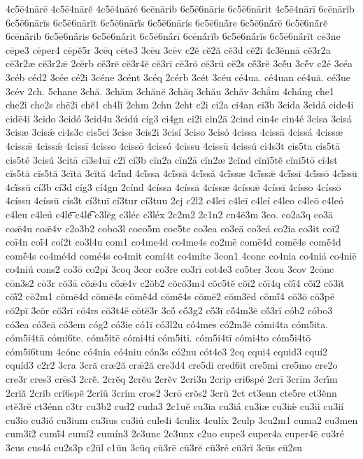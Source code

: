 {4c5ē4nārē
4c5ē4nārĕ
4c5ē4nāré
6cēnārib
6c5ē6nāris
6c5ē6nārit
4c5ē4nārī
6cēnārĭb
6c5ē6nārĭs
6c5ē6nārĭt
6c5ē6nārĭ́s
6c5ē6nārís
6c5ē6nā́re
6c5ē6nā́rē
6c5ē6nā́rĕ
6cēnā́rib
6c5ē6nā́ris
6c5ē6nā́rit
6c5ē6nā́rī
6cēnā́rĭb
6c5ē6nā́rĭs
6c5ē6nā́rĭt
cē3ne
cēpe3
cēper4
cēpĕ5r
3cēq
cēte3
3cēu
3cēv
c2ĕ
cĕ2ă
cĕ3d
cĕ2ĭ
4c3ĕnnā
cĕ3r2a
cĕ3r2æ
cĕ3r2ǣ
2cĕrb
cĕ3rē
cĕ3r4ĕ
cĕ3rī
cĕ3rŏ
cĕ3rŭ
cĕ2s
cĕ́3rĕ
3cĕ́u
3cĕ́v
c2é
3céa
3céb
céd2
3cée
cé2i
3céne
3cént
3céq
2cérb
3cét
3céu
cé4ua.
cé4uan
cé4uā.
cé3ue
3cév
2ch.
5chane
3chă.
3chăm
3chănĕ
3chăq
3chău
3chăv
3chắm
4cháng
che1
che2i
che2s
chē2i
chĕ1
ch4lĭ
2chm
2chn
2cht
c2i
ci2a
ci4an
ci3b
3cida
3cidá
cide4i
cidē4i
3cido
3cidó
3cid4u
3cidú
cig3
ci4gn
ci2i
cin2ā
2cind
cin4e
cin4é
3cisa
3cisá
3cisæ
3cisǽ
ci4s3c
cis5ci
3cise
3cis2i
3cisí
3ciso
3cisó
4cissa
4cissā
4cissá
4cissæ
4cissǣ
4cissǽ
4cissī
4cisso
4cissō
4cissó
4cissu
4cissū
4cissú
ci4s3t
cis5ta
cis5tā
cis5té
3cisú
3citā
cī3s4uī
c2ĭ
cĭ3b
cĭn2a
cĭn2ā
cĭn2æ
2cĭnd
cĭnĭ5tĕ
cĭnĭ5tō
cĭ4st
cĭs5tā
cĭs5tă
3cĭtā
3cĭtă
4cĭ́nd
4cĭ́ssa
4cĭ́ssā
4cĭ́ssă
4cĭ́ssæ
4cĭ́ssǣ
4cĭ́ssī
4cĭ́ssō
4cĭ́ssū
4cĭ́ssŭ
cí3b
cí3d
cíg3
cí4gn
2cínd
4císsa
4císsā
4císsæ
4císsǣ
4císsī
4císso
4císsō
4císsu
4císsū
cís3t
cí3tuī
cí3tur
cí3tuu
2cj
c2l2
c4lei
c4leī
c4leí
c4leo
c4leō
c4leó
c4leu
c4leú
c4le͞
c4le͡
c3lĕg
c3léc
c3léx
2c2m2
2c1n2
cn4ē3m
3co.
co2a3q
co3ā
coǣ4u
coǣ4v
c2o3b2
cobo3l
coco5m
coc5te
co3ea
co3eā
co3eá
co2ia
co3it
coī2
coī4n
coī́4
coí2t
co3l4u
com1
co4me4d
co4me4s
co2mē
comē4d
comē4s
comḗ4d
comḗ4s
co4mé4d
comé4s
co4mit
comí4t
co4míte
3con1
4conc
co4nia
co4niá
co4niē
co4niú
cons2
co3ō
co2pī
3coq
3cor
co3re
co3rī
cot4e3
co5ter
3cou
3cov
2cōnc
cōn3s2
cō3r
cŏ3ā
cŏǣ4u
cŏǣ4v
c2ŏb2
cŏcŏ3m4
cŏc5tĕ
cŏī2
cŏī4q
cŏī́4
cŏĭ2
cŏ3ĭt
cŏĭ́2
cŏ2m1
cŏmē4d
cŏmē4s
cŏmḗ4d
cŏmḗ4s
cŏmĕ2
cŏm3ĕd
cŏmĭ́4
cŏ3ō
cŏ3pĕ
cŏ2pī
3cŏr
cŏ3rī
cŏ4rs
cŏ3t4ĕ
cŏtĕ3r
3cŏ́
cŏ́3g2
cŏ́3ī
cŏ́4m3ē
cŏ́3rĭ
cób2
cóbo3
có3ea
có3eā
có3em
cóg2
có3ie
có1ī
có3l2u
có4mes
có2m3ē
cómi4ta
cóm5ita.
cóm5i4tā
cómi6te.
cóm5itē
cómi4ti
cóm5iti.
cóm5i4tī
cómi4to
cóm5i4tō
cóm5i6tum
4cónc
có4nia
có4niu
cón3s
có2nu
cót4e3
2cq
cqui4
cquid3
cquí2
cquíd3
c2r2
3cra
3cră
cræ2ă
crǣ2ă
cre3d4
cre5di
cred6it
cre5mi
cre5mo
cre2o
cre3r
cres3
crēs3
2crĕ.
2crĕq
2crĕu
2crĕv
2cri3n
2crip
cri6spé
2crī
3crīm
3crī́m
2crĭă
2crĭb
crĭ6spĕ
2crĭŭ
3crím
cros2
3crō
crŏs2
3crŭ
2ct
ct3enn
cte5re
ct3ĕnn
ctĕ3rĕ
ct3énn
c3tr
cu3b2
cud2
cuda3
2c1uĕ
cu3ia
cu3iá
cu3iæ
cu3iǽ
cu3ii
cu3ií
cu3io
cu3ió
cu3ium
cu3ius
cu3iú
cule4i
4culix
4culíx
2culp
3cu2m1
cuma2
cu3men
cum3i2
cumī́4
cumí2
cumín3
2c3unc
2c3unx
c2uo
cupe3
cuper4a
cuper4ē
cu3ré
3cus
cus4á
cu2s3p
c2ūl
c1ūn
3cūq
cū3rē
cū3rĕ
cū3ré
cū3rĭ
3cūs
cū2su
}
